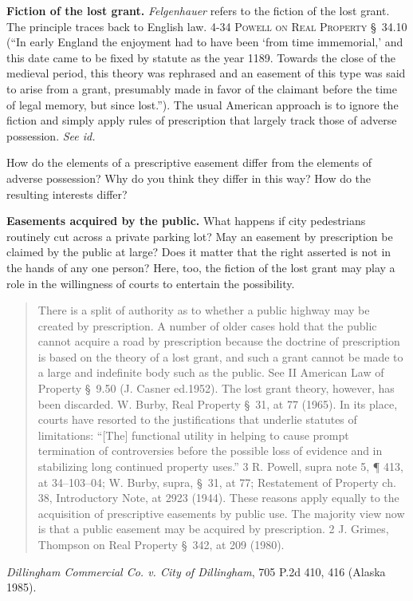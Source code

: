 
\item \textbf{Fiction of the lost grant.} \textit{Felgenhauer} refers to the
fiction of the lost grant. The principle traces back to English law. 4-34
\textsc{Powell on Real Property} \S~34.10 (``In early England the enjoyment had
to have been `from time immemorial,' and this date came to be fixed by statute
as the year 1189. Towards the close of the medieval period, this theory was
rephrased and an easement of this type was said to arise from a grant,
presumably made in favor of the claimant before the time of legal memory, but
since lost.''). The usual American approach is to ignore the fiction and simply
apply rules of prescription that largely track those of adverse possession.
\textit{See id.} 


\item How do the elements of a prescriptive easement differ from the elements of
adverse possession? Why do you think they differ in this way? How do the
resulting interests differ?


\item \textbf{Easements acquired by the public.} What happens if city
pedestrians routinely cut across a private parking lot? May an easement by
prescription be claimed by the public at large? Does it matter that the right
asserted is not in the hands of any one person? Here, too, the fiction of the
lost grant may play a role in the willingness of courts to entertain the
possibility.
\begin{quote}
There is a split of authority as to whether a public highway may be created by
prescription. A number of older cases hold that the public cannot acquire a road
by prescription because the doctrine of prescription is based on the theory of a
lost grant, and such a grant cannot be made to a large and indefinite body such
as the public. See II American Law of Property \S~9.50 (J. Casner ed.1952). The
lost grant theory, however, has been discarded. W. Burby, Real Property \S~31,
at 77 (1965). In its place, courts have resorted to the justifications that
underlie statutes of limitations: ``[The] functional utility in helping to cause
prompt termination of controversies before the possible loss of evidence and in
stabilizing long continued property uses.'' 3 R. Powell, supra note 5, {\P} 413,
at 34--103--04; W. Burby, supra, \S~31, at 77; Restatement of Property ch. 38,
Introductory Note, at 2923 (1944). These reasons apply equally to the
acquisition of prescriptive easements by public use. The majority view now is
that a public easement may be acquired by prescription. 2 J. Grimes, Thompson on
Real Property \S~342, at 209 (1980). 
\end{quote}
\emph{Dillingham Commercial Co. v. City of Dillingham}, 705 P.2d 410, 416
(Alaska 1985).

